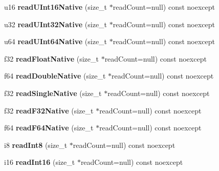 \begin{DoxyCompactItemize}
u16 {\bfseries read\+U\+Int16\+Native} (size\+\_\+t $\ast$read\+Count=null) const noexcept
\item 
\mbox{\label{class_binary_reader_aa71d6af014fdf51321059c2e104670b8}} 
u32 {\bfseries read\+U\+Int32\+Native} (size\+\_\+t $\ast$read\+Count=null) const noexcept
\item 
\mbox{\label{class_binary_reader_a86e08f622403291040fb9165437a4645}} 
u64 {\bfseries read\+U\+Int64\+Native} (size\+\_\+t $\ast$read\+Count=null) const noexcept
\item 
\mbox{\label{class_binary_reader_a13e3c27d8fcf966f60444b269bca800d}} 
f32 {\bfseries read\+Float\+Native} (size\+\_\+t $\ast$read\+Count=null) const noexcept
\item 
\mbox{\label{class_binary_reader_ac1786df7b24ffdbf114ba99ae4a9d060}} 
f64 {\bfseries read\+Double\+Native} (size\+\_\+t $\ast$read\+Count=null) const noexcept
\item 
\mbox{\label{class_binary_reader_ab22c9e891805e282cd84b94004c74a5a}} 
f32 {\bfseries read\+Single\+Native} (size\+\_\+t $\ast$read\+Count=null) const noexcept
\item 
\mbox{\label{class_binary_reader_a3b25460805e1e026bb1ae1bdec9c0e28}} 
f32 {\bfseries read\+F32\+Native} (size\+\_\+t $\ast$read\+Count=null) const noexcept
\item 
\mbox{\label{class_binary_reader_aee3aae645f501e9b7f1d8cc3dc142dc7}} 
f64 {\bfseries read\+F64\+Native} (size\+\_\+t $\ast$read\+Count=null) const noexcept
\item 
\mbox{\label{class_binary_reader_a0afbf69fa0bc0d8039f7cb256c5992d9}} 
i8 {\bfseries read\+Int8} (size\+\_\+t $\ast$read\+Count=null) const noexcept
\item 
\mbox{\label{class_binary_reader_aa187099e23026be0c6565379d819b50f}} 
i16 {\bfseries read\+Int16} (size\+\_\+t $\ast$read\+Count=null) const noexcept
\item 
\mbox{\label{class_binary_reader_a5460ac68f4f62d540db31f3caf1ffb06}} 

\end{DoxyCompactItemize}
